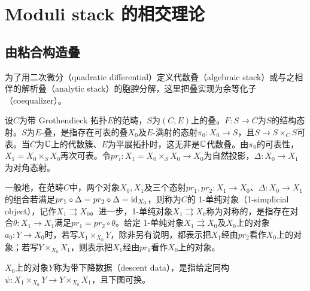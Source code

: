 
\section{Moduli stack 的相交理论}

\subsection{由粘合构造叠}

为了用二次微分（quadratic differential）定义代数叠（algebraic stack）或与之相伴的解析叠（analytic stack）的胞腔分解，这里把叠实现为余等化子（coequalizer）。

设$C$为带 Grothendieck 拓扑$E$的范畴，$S$为$(C,E)$上的叠。$F:S\to C$为$S$的结构态射。$S$为$E$-叠，是指存在可表的叠$X_0$及$E$-满射的态射$\pi_0:X_0\to S$，且$S\to S\times_CS$可表。当$C$为$\mathbb{C}$上的代数簇、$E$为平展拓扑时，这无非是$\mathbb{C}$代数叠。由$\pi_0$的可表性，$X_1=X_0\times_SX_0$再次可表。令$pr_i:X_1=X_0\times_SX_0\to X_0$为自然投影，$\Delta:X_0\to X_1$为对角态射。

一般地，在范畴$C$中，两个对象$X_0,X_1$及三个态射$pr_1,pr_2:X_1\to X_0$、$\Delta:X_0\to X_1$的组合若满足$pr_1\circ\Delta=pr_2\circ\Delta=\mathrm{id}_{X_0}$，则称为$C$的 1-单纯对象（1-simplicial object），记作$X_1\rightrightarrows X_0$。进一步，1-单纯对象$X_1\rightrightarrows X_0$称为对称的，是指存在对合$\theta:X_1\to X_1$满足$pr_1=pr_2\circ\theta$。给定 1-单纯对象$X_1\rightrightarrows X_0$及$X_0$上的对象$a_0:Y\to X_0$时，若写$X_1\times_{X_0}Y$，除非另有说明，都表示把$X_1$经由$pr_2$看作$X_0$上的对象；若写$Y\times_{X_0}X_1$，则表示把$X_1$经由$pr_1$看作$X_0$上的对象。

$X_0$上的对象$Y$称为带下降数据（descent data），是指给定同构$\psi:X_1\times_{X_0}Y\to Y\times_{X_0}X_1$，且下图可换。
\begin{center}
\end{center}

